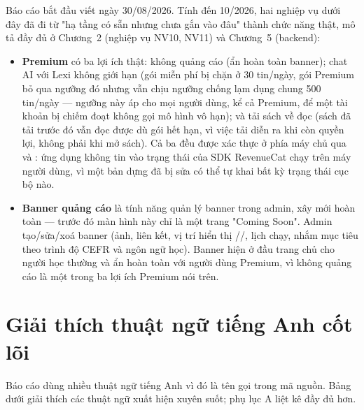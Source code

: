 \begin{luuy}
Báo cáo bắt đầu viết ngày 30/08/2026. Tính đến 10/2026, hai nghiệp vụ dưới đây đã đi từ
"hạ tầng có sẵn nhưng chưa gắn vào đâu" thành chức năng thật, mô tả đầy đủ ở Chương~2
(nghiệp vụ NV10, NV11) và Chương~5 (backend):
\begin{itemize}[leftmargin=1.4em]
  \item \textbf{Premium} có ba lợi ích thật: không quảng cáo (ẩn hoàn toàn banner); chat
  AI với Lexi không giới hạn (gói miễn phí bị chặn ở 30 tin/ngày, gói Premium bỏ qua
  ngưỡng đó nhưng vẫn chịu ngưỡng chống lạm dụng chung 500 tin/ngày — ngưỡng này áp cho
  mọi người dùng, kể cả Premium, để một tài khoản bị chiếm đoạt không gọi mô hình vô hạn);
  và tải sách về đọc  (sách đã tải trước đó vẫn đọc được dù gói hết hạn, vì
  việc tải diễn ra khi còn quyền lợi, không phải khi mở sách). Cả ba đều được xác thực ở
  phía máy chủ qua  và : ứng dụng không
  tin vào trạng thái của SDK RevenueCat chạy trên máy người dùng, vì một bản dựng đã bị
  sửa có thể tự khai bất kỳ trạng thái cục bộ nào.
  \item \textbf{Banner quảng cáo} là tính năng quản lý banner trong admin, xây mới hoàn
  toàn — trước đó màn hình này chỉ là một trang "Coming Soon". Admin tạo/sửa/xoá banner
  (ảnh, liên kết, vị trí hiển thị //, lịch chạy,
  nhắm mục tiêu theo trình độ CEFR và ngôn ngữ học). Banner hiện ở đầu trang chủ cho người
  học thường và ẩn hoàn toàn với người dùng Premium, vì không quảng cáo là một trong ba
  lợi ích Premium nói trên.
\end{itemize}
\end{luuy}

\section{Giải thích thuật ngữ tiếng Anh cốt lõi}

Báo cáo dùng nhiều thuật ngữ tiếng Anh vì đó là tên gọi trong mã nguồn. Bảng dưới giải
thích các thuật ngữ xuất hiện xuyên suốt; phụ lục A liệt kê đầy đủ hơn.

